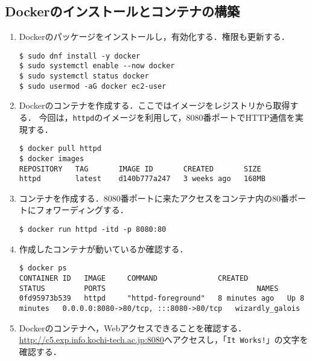 \subsection{Dockerのインストールとコンテナの構築}
\begin{enumerate}
    \item Dockerのパッケージをインストールし，有効化する．権限も更新する．
          \begin{lstlisting}
$ sudo dnf install -y docker
$ sudo systemctl enable --now docker
$ sudo systemctl status docker
$ sudo usermod -aG docker ec2-user
\end{lstlisting}
    \item Dockerのコンテナを作成する．ここではイメージをレジストリから取得する．
          今回は，\texttt{httpd}のイメージを利用して，8080番ポートでHTTP通信を実現する．
          \begin{lstlisting}
$ docker pull httpd
$ docker images
REPOSITORY   TAG       IMAGE ID       CREATED       SIZE
httpd        latest    d140b777a247   3 weeks ago   168MB
          \end{lstlisting}
    \item コンテナを作成する．8080番ポートに来たアクセスをコンテナ内の80番ポートにフォワーディングする．
          \begin{lstlisting}
$ docker run httpd -itd -p 8080:80
\end{lstlisting}
    \item  作成したコンテナが動いているか確認する．
          \begin{lstlisting}
$ docker ps 
CONTAINER ID   IMAGE     COMMAND              CREATED         STATUS         PORTS                                   NAMES
0fd95973b539   httpd     "httpd-foreground"   8 minutes ago   Up 8 minutes   0.0.0.0:8080->80/tcp, :::8080->80/tcp   wizardly_galois
\end{lstlisting}
    \item Dockerのコンテナへ，Webアクセスできることを確認する．
          \url{http://c5.exp.info.kochi-tech.ac.jp:8080}へアクセスし，「\texttt{It Works!}」の文字を確認する．
\end{enumerate}